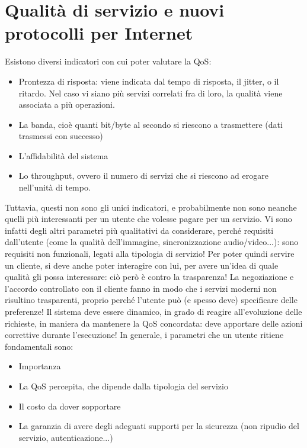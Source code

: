 \section{Qualità di servizio e nuovi protocolli per Internet}
Esistono diversi indicatori con cui poter valutare la QoS:
\begin{itemize}
 \item Prontezza di risposta: viene indicata dal tempo di risposta, il jitter, o il ritardo. Nel caso vi siano più
servizi correlati fra di loro, la qualità viene associata a più operazioni.
 \item La banda, cioè quanti bit/byte al secondo si riescono a trasmettere (dati trasmessi con successo)
 \item L'affidabilità del sistema
 \item Lo throughput, ovvero il numero di servizi che si riescono ad erogare nell'unità di tempo.
\end{itemize}
Tuttavia, questi non sono gli unici indicatori, e probabilmente non sono neanche quelli più interessanti per un utente
che volesse pagare per un servizio. Vi sono infatti degli altri parametri più qualitativi da considerare, perché
requisiti dall'utente (come la qualità dell'immagine, sincronizzazione audio/video...): sono requisiti non funzionali,
legati alla tipologia di servizio! Per poter quindi servire un cliente, si deve anche poter interagire con lui, per
avere un'idea di quale qualità gli possa interessare: ciò però è contro la trasparenza! La negoziazione e l'accordo
controllato con il cliente fanno in modo che i servizi moderni non risultino trasparenti, proprio perché l'utente può
(e spesso deve) specificare delle preferenze! Il sistema deve essere dinamico, in grado di reagire all'evoluzione
delle richieste, in maniera da mantenere la QoS concordata: deve apportare delle azioni correttive durante l'esecuzione!
In generale, i parametri che un utente ritiene fondamentali sono:
\begin{itemize}
 \item Importanza
 \item La QoS percepita, che dipende dalla tipologia del servizio
 \item Il costo da dover sopportare
 \item La garanzia di avere degli adeguati supporti per la sicurezza (non ripudio del servizio, autenticazione...)
\end{itemize}

